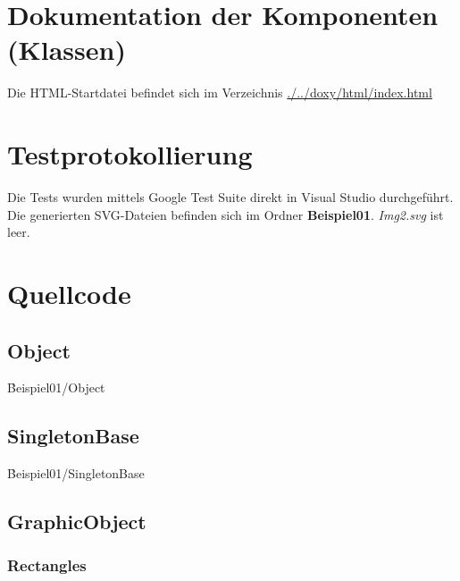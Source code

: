 \section{Dokumentation der Komponenten (Klassen)}

Die HTML-Startdatei befindet sich im Verzeichnis \href{run:./../doxy/html/index.html}{./../doxy/html/index.html}

\section{Testprotokollierung}
Die Tests wurden mittels Google Test Suite direkt in Visual Studio durchgeführt.\\
Die generierten SVG-Dateien befinden sich im Ordner \textbf{Beispiel01}. \textit{Img2.svg} ist leer.\\
\begin{minipage}{0.4\textwidth}
\end{minipage}
\begin{minipage}{0.4\textwidth}
\end{minipage}
\begin{minipage}{0.4\textwidth}
\end{minipage}

\section{Quellcode}

\subsection{Object}
\h{Beispiel01/Object}

\subsection{SingletonBase}
\h{Beispiel01/SingletonBase}

\subsection{GraphicObject}

\subsubsection{Rectangles}

